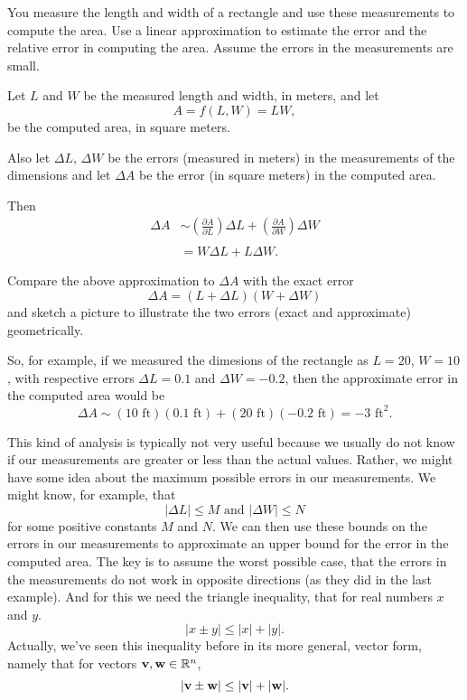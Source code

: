 \documentclass{ximera}
\begin{document}
\begin{example}  \label{Edstrt4th}
You measure the length and width of a rectangle and use these measurements to compute the area. Use a linear approximation to estimate the error and the relative error in computing the area. Assume the errors in the measurements are small.

\begin{explanation}
Let $L$ and $W$ be the measured length and width, in meters, and let
\[
  A =f(L,W) = LW ,
\]
be the computed area, in square meters. 

Also let $\Delta L$, $\Delta W$ be the errors (measured in meters) in the measurements of the dimensions and let $\Delta A$ be the error (in square meters) in the computed area.

Then
\begin{align*}
   \Delta A  &\sim  \left( \frac{\partial A}{\partial L} \right) \Delta L + \left( \frac{\partial A}{\partial W} \right)  \Delta W \\ \\
                &=  W\Delta L +  L \Delta W .
\end{align*}

\begin{question}  \label{Qegffg545}
Compare the above approximation to $\Delta A$ with the exact error
\[
    \Delta A = (L+\Delta L)(W + \Delta W) 
\]
and sketch a picture to illustrate the two errors (exact and approximate) geometrically.
\end{question}


So, for example, if we measured the dimesions of the rectangle as $L=20$, $W=10$, with respective errors $\Delta L = 0.1$ and $\Delta W = -0.2$, then the approximate error in the computed area would be
\[
    \Delta A \sim (10\text{ ft})(0.1 \text{ ft}) + (20 \text{ ft})(-0.2 \text{ ft}) = - 3 \text{ ft}^2 .
\]

This kind of analysis is typically not very useful because we usually do not know if our measurements are greater or less than the actual values. Rather, we might have some idea about the maximum possible errors in our measurements. We might know, for example, that
\[
      | \Delta L | \leq M \text{  and  }  |\Delta W| \leq N
\]
for some positive constants $M$ and $N$. We can then use these bounds on the errors in our measurements to approximate an upper bound for the error in the computed area. The key is to assume the worst possible case, that the errors in the measurements do not work in opposite directions (as they did in the last example). And for this we need the triangle inequality, that for real numbers $x$ and $y$.
\[
   | x \pm y | \leq |x| + |y| .
\] 
Actually, we've seen this inequality before in its more general, vector form, namely that for vectors ${\bf v}, {\bf w}\in \mathbb{R}^n$,
\[
      | {\bf v} \pm {\bf w}   |  \leq |{\bf v}| +  | {\bf w} | .
\]


\end{explanation}
\end{example}
\end{document}

